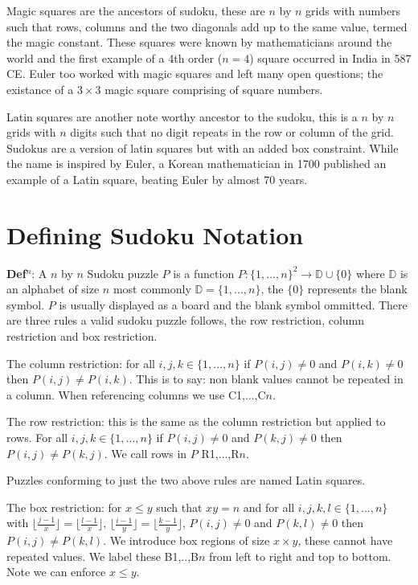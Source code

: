 \documentclass[a4paper,11pt]{report}
\newcounter{row}
\newcounter{col}
\begin{document}
Magic squares are the ancestors of sudoku, these are $n$ by $n$ grids with numbers such that rows, columns and the two diagonals add up to the same value, termed the magic constant. These squares were known by mathematicians around the world and the first example of a 4th order ($n=4$) square occurred in India in 587 CE. Euler too worked with magic squares and left many open questions; the existance of a $3\times 3$ magic square comprising of square numbers.

Latin squares are another note worthy ancestor to the sudoku, this is a $n$ by $n$ grids with $n$ digits such that no digit repeats in the row or column of the grid. Sudokus are a version of latin squares but with an added box constraint. While the name is inspired by Euler, a  Korean mathematician in 1700 published an example of a Latin square, beating Euler by almost 70 years. 
	
\section{Defining Sudoku Notation}
	
\textbf{Def$^n$}: A $n$ by $n$ Sudoku puzzle $P$ is a function $P:  \{1,...,n\}^2\rightarrow\mathbb D \cup \{0\}$ where $\mathbb D$ is an alphabet of size $n$ most commonly $\mathbb D = \{1,...,n\}$, the $\{0\}$ represents the blank symbol. $P$ is usually displayed as a board and the blank symbol ommitted. There are three rules a valid sudoku puzzle follows, the row restriction, column restriction and box restriction.

The column restriction: for all $i,j,k\in \{1,...,n\}$ if $P(i,j)\neq0$ and $P(i,k)\neq0$ then $P(i,j)\neq P(i,k)$. This is to say: non blank values cannot be repeated in a column. When referencing columns we use C1,...,C$n$.

The row restriction: this is the same as the column restriction but applied to rows. For all $i,j,k\in \{1,...,n\}$ if $P(i,j)\neq0$ and $P(k,j)\neq0$ then $P(i,j)\neq P(k,j)$. We call rows in $P$ R1,...,R$n$.

Puzzles conforming to just the two above rules are named Latin squares. 

The box restriction: for $x\leq y$ such that $xy=n$ and for all $i,j,k,l\in\{1,...,n\}$ with $\lfloor \frac{j-1}{x} \rfloor=\lfloor \frac{l-1}{x}\rfloor$, $\lfloor \frac{i-1}{y} \rfloor=\lfloor \frac{k-1}{y}\rfloor$, $P(i,j)\neq0$ and $P(k,l)\neq0$ then $P(i,j)\neq P(k,l)$. We introduce box regions of size $x\times y$, these cannot have repeated values. We label these B1,..,B$n$ from left to right and top to bottom. Note we can enforce $x\leq y$. 
\end{document}
